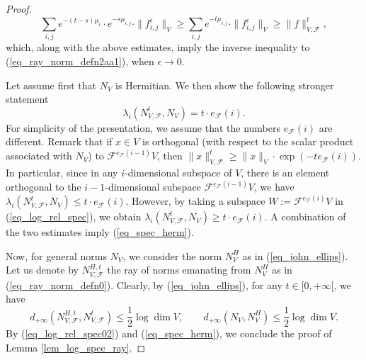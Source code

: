 \documentclass[10pt,a4paper]{amsart}
\begin{document}
\begin{proof}
\begin{equation}
			\sum_{i, j}
				e^{- (t - s) \mu_i} 
				\cdot
				e^{- s \mu_{i, j}} \cdot 
				\| f_{i, j}^{\epsilon} \|_V
			\geq
			\sum_{i, j}
				e^{- t  \mu_{i, j}} 
				\cdot 
				\| f_{i, j}^{\epsilon} \|_V
			\geq 
			\| f \|_{V, \mathcal{F}}^t,
		\end{equation}
		which, along with the above estimates, imply the inverse inequality to (\ref{eq_ray_norm_defn2aa1}), when $\epsilon \to 0$.
		\par 
		Let assume first that $N_V$ is Hermitian. We then show the following stronger statement
		\begin{equation}\label{eq_spec_herm}
			\lambda_i(N_{V, \mathcal{F}}^t, N_V) = t \cdot e_{\mathcal{F}}(i).
		\end{equation}
		For simplicity of the presentation, we assume that the numbers $e_{\mathcal{F}}(i)$ are different.
		Remark that if $x \in V$ is orthogonal (with respect to the scalar product associated with $N_V$) to $\mathcal{F}^{e_{\mathcal{F}}(i - 1)} V$, then $\| x \|_{V, \mathcal{F}}^t \geq \| x \|_V \cdot \exp(- t e_{\mathcal{F}}(i))$.
		In particular, since in any $i$-dimensional subspace of $V$, there is an element orthogonal to the $i - 1$-dimensional subspace $\mathcal{F}^{e_{\mathcal{F}}(i - 1)} V$, we have $\lambda_i(N_{V, \mathcal{F}}^t, N_V) \leq t  \cdot e_{\mathcal{F}}(i)$.
		However, by taking a subspace $W := \mathcal{F}^{e_{\mathcal{F}}(i)} V$ in (\ref{eq_log_rel_spec}), we obtain $\lambda_i(N_{V, \mathcal{F}}^t, N_V) \geq t \cdot e_{\mathcal{F}}(i)$.
		A combination of the two estimates imply (\ref{eq_spec_herm}).
		\par 
		Now, for general norms $N_V$, we consider the norm $N_V^H$ as in (\ref{eq_john_ellips}).
		Let us denote by $N_{V, \mathcal{F}}^{H, t}$ the ray of norms emanating from $N_V^H$ as in (\ref{eq_ray_norm_defn0}).
		Clearly, by (\ref{eq_john_ellips}), for any $t \in [0, +\infty[$, we have 
		\begin{equation}
			d_{+ \infty}(N_{V, \mathcal{F}}^{H, t}, N_{V, \mathcal{F}}^t) \leq \frac{1}{2} \log \dim V,
			\qquad
			d_{+ \infty}(N_V, N_V^H) \leq \frac{1}{2} \log \dim V.
		\end{equation}
		By (\ref{eq_log_rel_spec02}) and (\ref{eq_spec_herm}), we conclude the proof of Lemma \ref{lem_log_spec_ray}.
	\end{proof}
\end{document}
